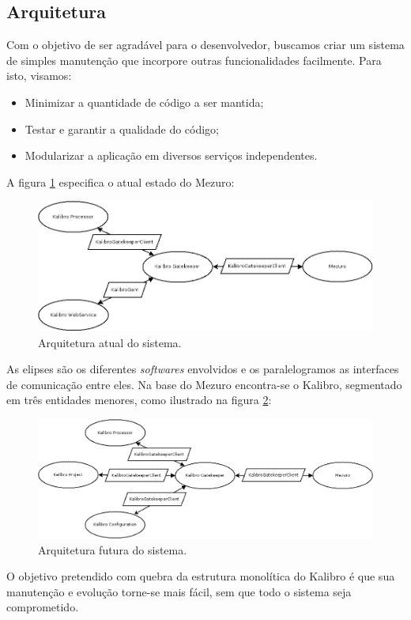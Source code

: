 \documentclass{llncs}
\begin{document}
  \subsection{Arquitetura}
  Com o objetivo de ser agradável para o desenvolvedor, buscamos criar um sistema de simples manutenção que incorpore outras funcionalidades facilmente. Para isto, visamos:
  \begin{itemize}
    \item Minimizar a quantidade de código a ser mantida;
    \item Testar e garantir a qualidade do código;
    \item Modularizar a aplicação em diversos serviços independentes.
  \end{itemize}

  A figura \ref{fig:architecture-1} especifica o atual estado do Mezuro:
  \begin{figure}[H]
    \centering
    \includegraphics[width=\textwidth]{images/mezuro-architecture-actual.png}
    \caption{Arquitetura atual do sistema.}
    \label{fig:architecture-1}
  \end{figure}
  As elipses são os diferentes \textit{softwares} envolvidos e os paralelogramos as interfaces de comunicação entre eles. Na base do Mezuro encontra-se o Kalibro, segmentado em três entidades menores, como ilustrado na figura \ref{fig:architecture-2}:
  \begin{figure}[H]
    \centering
      \includegraphics[width=\textwidth]{images/mezuro-architecture-predicted.png}
    \caption{Arquitetura futura do sistema.}
    \label{fig:architecture-2}
  \end{figure}
  O objetivo pretendido com quebra da estrutura monolítica do Kalibro é que sua manutenção e evolução torne-se mais fácil, sem que todo o sistema seja comprometido.
\end{document}
